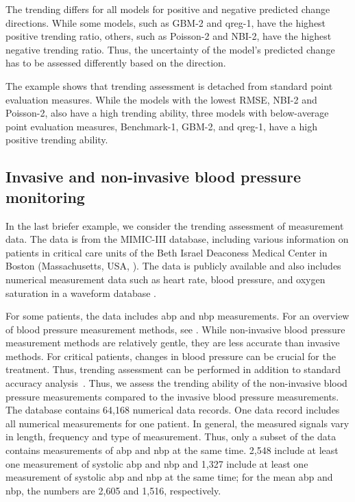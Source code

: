 The trending differs for all models for positive and negative predicted change directions.
While some models, such as GBM-2 and qreg-1, have the highest positive trending ratio, others, such as Poisson-2 and NBI-2, have the highest negative trending ratio.
Thus, the uncertainty of the model's predicted change has to be assessed differently based on the direction.

The example shows that trending assessment is detached from standard point evaluation measures.
While the models with the lowest RMSE, NBI-2 and Poisson-2, also have a high trending ability, three models with below-average point evaluation measures, Benchmark-1, GBM-2, and qreg-1, have a high positive trending ability.


\subsection{Invasive and non-invasive blood pressure monitoring} \label{sec:application_measurement}

In the last briefer example, we consider the trending assessment of measurement data.
The data is from the MIMIC-III database, including various information on patients in critical care units of the Beth Israel Deaconess Medical Center in Boston (Massachusetts, USA, \cite{Johnson2016}).
The data is publicly available and also includes numerical measurement data such as heart rate, blood pressure, and oxygen saturation in a waveform database \parencites[][]{Moody2017}[available through][]{Goldberger2000}.

For some patients, the data includes \ac{abp} and \ac{nbp} measurements.
For an overview of blood pressure measurement methods, see \textcite{Saugel2014}.
While non-invasive blood pressure measurement methods are relatively gentle, they are less accurate than invasive methods.
For critical patients, changes in blood pressure can be crucial for the treatment.
Thus, trending assessment can be performed in addition to standard accuracy analysis~\parencite[see, e.g., ]{Mostafa2020}.
Thus, we assess the trending ability of the non-invasive blood pressure measurements compared to the invasive blood pressure measurements.
The database contains 64,168 numerical data records.
One data record includes all numerical measurements for one patient.
In general, the measured signals vary in length, frequency and type of measurement.
Thus, only a subset of the data contains measurements of \ac{abp} and \ac{nbp} at the same time.
2,548 include at least one measurement of systolic \ac{abp} and \ac{nbp} and 1,327 include at least one measurement of systolic \ac{abp} and \ac{nbp} at the same time; for the mean \ac{abp} and \ac{nbp}, the numbers are 2,605 and 1,516, respectively.

